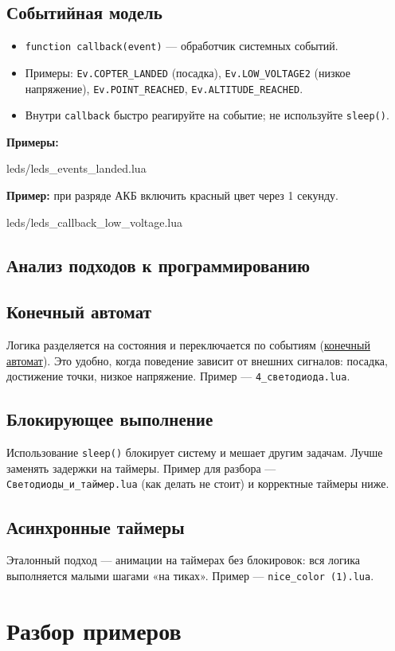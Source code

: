 \subsection{Событийная модель}
\begin{itemize}
  \item \verb|function callback(event)| — обработчик системных событий.
  \item Примеры: \verb|Ev.COPTER_LANDED| (посадка), \verb|Ev.LOW_VOLTAGE2| (низкое напряжение), \verb|Ev.POINT_REACHED|, \verb|Ev.ALTITUDE_REACHED|.
  \item Внутри \verb|callback| быстро реагируйте на событие; не используйте \verb|sleep()|.
\end{itemize}
\textbf{Примеры:}
\begin{codefile}{leds/leds_events_landed.lua}
\end{codefile}
\textbf{Пример:} при разряде АКБ включить красный цвет через 1 секунду.
\begin{codefile}{leds/leds_callback_low_voltage.lua}
\end{codefile}

\subsection{Анализ подходов к программированию}
\subsection{Конечный автомат}
Логика разделяется на состояния и переключается по событиям (\hyperlink{term:automaton}{конечный автомат}). Это удобно, когда поведение зависит от внешних сигналов: посадка, достижение точки, низкое напряжение. Пример — \verb|4_светодиода.lua|.
\subsection{Блокирующее выполнение}
Использование \verb|sleep()| блокирует систему и мешает другим задачам. Лучше заменять задержки на таймеры. Пример для разбора — \verb|Светодиоды_и_таймер.lua| (как делать не стоит) и корректные таймеры ниже.
\subsection{Асинхронные таймеры}
Эталонный подход — анимации на таймерах без блокировок: вся логика выполняется малыми шагами «на тиках». Пример — \verb|nice_color (1).lua|.

\section{Разбор примеров}
